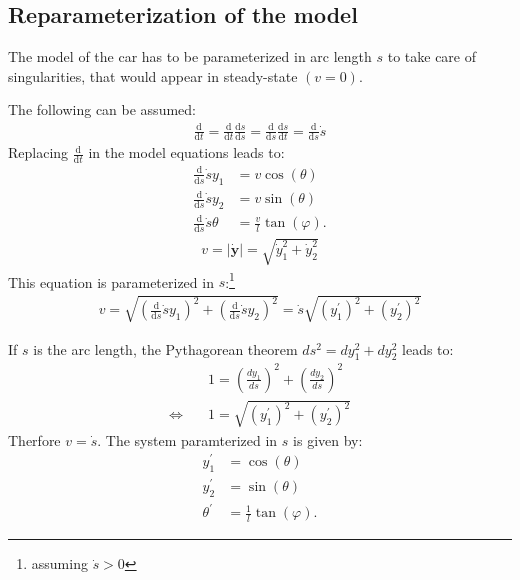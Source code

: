 \documentclass[a4paper,11pt,headings=standardclasses,parskip=half]{scrartcl}
\renewcommand{\d}{\mathrm{d}} %
\begin{document}
\subsection{Reparameterization of the model}
The model of the car has to be parameterized in arc length $s$ to take care of singularities, that would appear in steady-state $(v=0)$.

The following can be assumed:
\begin{align*}
\frac{\d}{\d t} = \frac{\d}{\d t}\frac{\d s}{\d s} = \frac{\d}{\d s}\frac{\d s}{\d t} = \frac{\d}{\d s}\dot s
\end{align*}
Replacing $\frac{\d}{\d t}$ in the model equations leads to:
\begin{subequations}
\begin{align}
\frac{\d}{\d s}\dot s y_1 &= v \cos(\theta)\\
\frac{\d}{\d s}\dot s y_2 &= v \sin(\theta)\\
\frac{\d}{\d s}\dot s \theta &= \frac{v}{l}\tan(\varphi).
\end{align}
\end{subequations}
\begin{align}
v = |\dot{\bm{y}}| = \sqrt{\dot y_1^2+\dot y_2^2}
\end{align}
This equation is parameterized in $s$:\footnote{assuming $\dot s > 0$} 
\begin{align}
v = \sqrt{(\frac{\d}{\d s}\dot sy_1)^2+(\frac{\d}{\d s}\dot s y_2)^2}=\dot s \sqrt{(y_1^\prime)^2+(y_2^\prime)^2}
\end{align}
 
If $s$ is the arc length, the Pythagorean theorem $ds^2 = dy_1^2 + dy_2^2$ leads to:
\begin{subequations}
\begin{align}
&1 = \left(\frac{dy_1}{ds}\right)^2 + \left(\frac{dy_2}{ds}\right)^2  \\
\Leftrightarrow \quad & 1 = \sqrt{(y_1^\prime)^2+(y_2^\prime)^2}
\end{align}
\end{subequations}
Therfore $v=\dot s$. 
The system paramterized in $s$ is given by:
\begin{subequations}
\begin{align}
y_1^\prime &= \cos(\theta)\\
y_2^\prime &= \sin(\theta)\\
\theta^\prime &= \frac{1}{l}\tan(\varphi).
\end{align}
\end{subequations}
\end{document}
